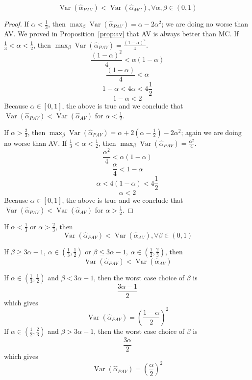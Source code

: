 \documentclass[10pt]{article}
\DeclareMathOperator{\var}{Var}
\begin{document}
\begin{proposition}\label{prop:pav}
\[
\var\left(\hat{\alpha}_{PAV}\right) < \var\left(\hat{\alpha}_{MC}\right), \forall \alpha,\beta \in (0,1)
\]
\end{proposition}
\begin{proof}
If $\alpha < \frac{1}{3}$, then $\displaystyle\max_{\beta}\var\left(\hat{\alpha}_{PAV}\right)=\alpha-2\alpha^2$; we are doing no worse than \ac{AV}. We proved in Proposition~\ref{prop:av} that \ac{AV} is always better than \ac{MC}. If $\frac{1}{3} < \alpha < \frac{1}{2}$, then $\displaystyle\max_{\beta}\var\left(\hat{\alpha}_{PAV}\right)=\frac{(1-\alpha)^2}{4}$.
\[
\frac{(1-\alpha)^2}{4} < \alpha(1-\alpha)
\]
\[
\frac{(1-\alpha)}{4} < \alpha
\]
\[
1-\alpha < 4\alpha < 4\frac{1}{2}
\]
\[
1-\alpha < 2
\]
Because $\alpha\in[0,1]$, the above is true and we conclude that $\var\left(\hat{\alpha}_{PAV}\right) < \var\left(\hat{\alpha}_{AV}\right)$ for $\alpha < \frac{1}{2}$.

If $\alpha > \frac{2}{3}$, then  $\displaystyle\max_{\beta}\var\left(\hat{\alpha}_{PAV}\right)=\alpha+2(\alpha-\frac{1}{2})-2\alpha^2$; again we are doing no worse than \ac{AV}. If $\frac{1}{3} < \alpha < \frac{1}{2}$, then $\displaystyle\max_{\beta}\var\left(\hat{\alpha}_{PAV}\right)=\frac{\alpha^2}{4}$.
\[
\frac{\alpha^2}{4} < \alpha(1-\alpha)
\]
\[
\frac{\alpha}{4} < 1-\alpha
\]
\[
\alpha < 4(1-\alpha) < 4\frac{1}{2}
\]
\[
\alpha < 2
\]
Because $\alpha\in[0,1]$, the above is true and we conclude that $\var\left(\hat{\alpha}_{PAV}\right) < \var\left(\hat{\alpha}_{AV}\right)$ for $\alpha > \frac{1}{2}$.

\end{proof}
\begin{corollary}
If $\alpha < \frac{1}{3}$ or $\alpha > \frac{2}{3}$, then
\[
\var\left(\hat{\alpha}_{PAV}\right) < \var\left(\hat{\alpha}_{AV}\right), \forall \beta \in (0,1)
\]
\end{corollary}

\begin{corollary}
If $\beta \geq 3\alpha -1,~\alpha \in (\frac{1}{3},\frac{1}{2})$ or $\beta \leq 3\alpha -1,~\alpha \in (\frac{1}{2},\frac{2}{3})$, then
\[
\var\left(\hat{\alpha}_{PAV}\right) < \var\left(\hat{\alpha}_{AV}\right)
\]
\end{corollary}

\begin{corollary}
If $\alpha \in (\frac{1}{3},\frac{1}{2})$ and $\beta < 3\alpha -1$, then the worst case choice of $\beta$ is
\[
\frac{3\alpha - 1}{2}
\]
which gives
\[
\var\left(\hat{\alpha}_{PAV}\right) =\left(\frac{1-\alpha}{2}\right)^2
\]
If $\alpha \in (\frac{1}{2},\frac{2}{3})$ and $\beta > 3\alpha -1$, then the worst case choice of $\beta$ is
\[
\frac{3\alpha}{2}
\]
which gives
\[
\var\left(\hat{\alpha}_{PAV}\right) =\left(\frac{\alpha}{2}\right)^2
\]
\end{corollary}
\end{document}
